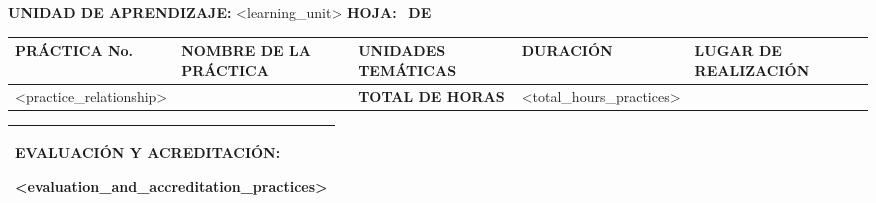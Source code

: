 \textbf{UNIDAD DE APRENDIZAJE:} <learning_unit>
\tab[1cm]
\textbf{HOJA: } \thepage\
\tab[0.25cm]
\textbf{DE } \pageref{LastPage}\\
\begin{center}
\end{center}
\begin{table}[H]
  \begin{tabular}{|p{}|p{}|p{}|p{}|p{}|}
    \hline
    \Centering\textbf{PRÁCTICA No.} & \Centering\textbf{NOMBRE DE LA PRÁCTICA} & \Centering\textbf{UNIDADES TEMÁTICAS} & \Centering\textbf{DURACIÓN} & \Centering\textbf{LUGAR DE REALIZACIÓN}\\
    \hline 
    <practice_relationship>
    \hline &&\Centering\textbf{TOTAL DE HORAS}& <total_hours_practices> &\\\hline 
  \end{tabular}
  \begin{tabular}{|p{1.045\textwidth}|}
    \textbf{EVALUACIÓN Y ACREDITACIÓN:}

    <evaluation_and_accreditation_practices>\\\hline
  \end{tabular}
\end{table}



